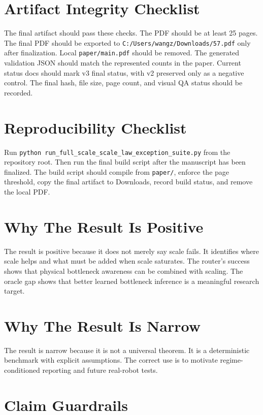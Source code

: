 \section{Artifact Integrity Checklist}

The final artifact should pass these checks. The PDF should be at least 25 pages. The final PDF should be exported to \texttt{C:/Users/wangz/Downloads/57.pdf} only after finalization. Local \texttt{paper/main.pdf} should be removed. The generated validation JSON should match the represented counts in the paper. Current status docs should mark v3 final status, with v2 preserved only as a negative control. The final hash, file size, page count, and visual QA status should be recorded.

\section{Reproducibility Checklist}

Run \texttt{python run\_full\_scale\_scale\_law\_exception\_suite.py} from the repository root. Then run the final build script after the manuscript has been finalized. The build script should compile from \texttt{paper/}, enforce the page threshold, copy the final artifact to Downloads, record build status, and remove the local PDF.

\section{Why The Result Is Positive}

The result is positive because it does not merely say scale fails. It identifies where scale helps and what must be added when scale saturates. The router's success shows that physical bottleneck awareness can be combined with scaling. The oracle gap shows that better learned bottleneck inference is a meaningful research target.

\section{Why The Result Is Narrow}

The result is narrow because it is not a universal theorem. It is a deterministic benchmark with explicit assumptions. The correct use is to motivate regime-conditioned reporting and future real-robot tests.

\section{Claim Guardrails}

